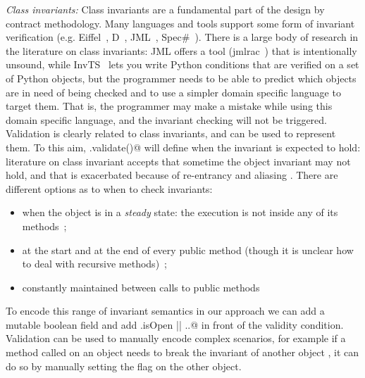 \noindent\textit{Class invariants:}
Class invariants are a fundamental part of the design by contract methodology. 
Many languages and tools support some form of invariant verification (e.g. Eiffel~\cite{Meyer:1992:EL:129093}, D~\cite{Alexandrescu:2010:DPL:1875434}, JML~\cite{Burdy2005}, Spec\#~\cite{Barnett:2004:SPS:2131546.2131549}).
There is a large body of research in the literature on class invariants:
JML offers a tool (jmlrac~\cite{Burdy2005}) that is intentionally unsound,
while InvTS~\cite{gorbovitski08efficient} lets you write Python conditions
 that are verified on a set of Python objects, but the programmer needs to be able
 to predict which objects are in need of being checked and to use a simpler domain
 specific language to target them. That is, the programmer may make a mistake
while using this domain specific language, and the invariant checking
will not be triggered.
Validation is clearly related to class invariants, and can be used to represent them.
To this aim, \Q@.validate()@ will define when the invariant is expected to hold:
literature on class invariant accepts that sometime the object invariant may not hold,
and that is exacerbated because of re-entrancy and aliasing
\cite{leino2004object,drossopoulou2008unified}.
There are different options as to when to check invariants:
\begin{itemize}
\item  when the object is in a \textit{steady} state:
 the execution is not inside any of its methods~\cite{Gopinathan:2008:RMO:1483018.1483028};
\item
at the start and at the end of every public method
(though it is unclear how to deal with recursive methods)~\cite{Burdy2005};
\item
constantly maintained between calls to public methods~\cite{WikiInvariant}
\end{itemize}
To encode this range of invariant semantics
in our approach we can add a mutable boolean \Q@isOpen@ field and add \Q@this.isOpen || ..@
in front of the validity condition.
Validation can be used to manually encode complex scenarios,
for example if a method called on an object needs to break the invariant of another object ,
it can do so by manually setting the \Q@isOpen@ flag on the other object.


